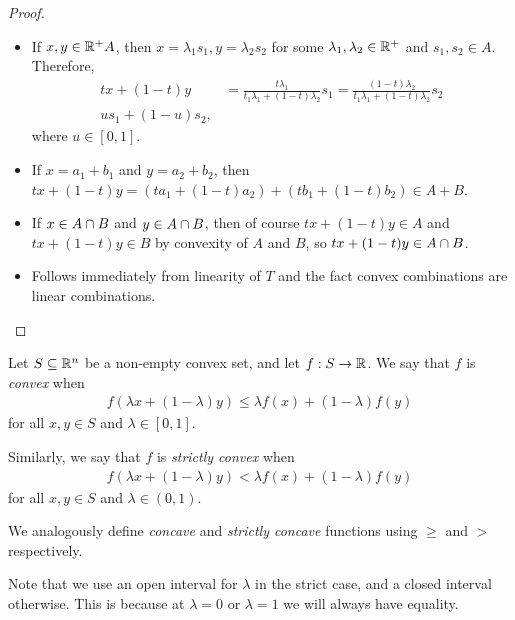 \begin{proof}\proofbreak
    \begin{itemize}
        \item If $x, y \in \mathbb{R}^{+}A$, then $x = \lambda_1s_1, y = \lambda_2s_2$ for some $\lambda_1, \lambda_2 \in \mathbb{R}^+$ and $s_1, s_2 \in A$. Therefore,
        \begin{align*}
            tx + (1-t)y &= \frac{t\lambda_1}{t_1\lambda_1 + (1-t)\lambda_2}s_1 = \frac{(1-t)\lambda_2}{t_1\lambda_1 + (1-t)\lambda_2}s_2 \\
            us_1 + (1-u)s_2,
        \end{align*}
        where $u \in [0, 1]$.
        \item If $x = a_1 + b_1$ and $y = a_2 + b_2$, then $tx + (1-t)y = (ta_1 + (1-t)a_2) + (tb_1 + (1-t)b_2) \in A + B$.
        \item If $x \in A \cap B$ and $y \in A \cap B$, then of course $tx + (1-t)y \in A$ and $tx + (1-t)y \in B$ by convexity of $A$ and $B$, so $tx + (1-t)y \in A \cap B$.
        \item Follows immediately from linearity of $T$ and the fact convex combinations are linear combinations.
    \end{itemize}
\end{proof}

\begin{defn}
    Let $S \subseteq \mathbb{R}^n$ be a non-empty convex set, and let $f: S \to \mathbb{R}$. We say that $f$ is \emph{convex} when
    \begin{align*}
        f\left(\lambda x + (1 - \lambda)y\right) \leq \lambda f(x) + (1 - \lambda)f(y)
    \end{align*}
    for all $x, y \in S$ and $\lambda \in [0, 1]$.

    Similarly, we say that $f$ is \emph{strictly convex} when
    \begin{align*}
        f\left(\lambda x + (1 - \lambda)y\right) < \lambda f(x) + (1 - \lambda)f(y)
    \end{align*}
    for all $x, y \in S$ and $\lambda \in (0, 1)$.

    We analogously define \emph{concave} and \emph{strictly concave} functions using $\geq$ and $>$ respectively.
\end{defn}

\begin{rmk}
    Note that we use an open interval for $\lambda$ in the strict case, and a closed interval otherwise. This is because at $\lambda = 0$ or $\lambda = 1$ we will always have equality.
\end{rmk}

